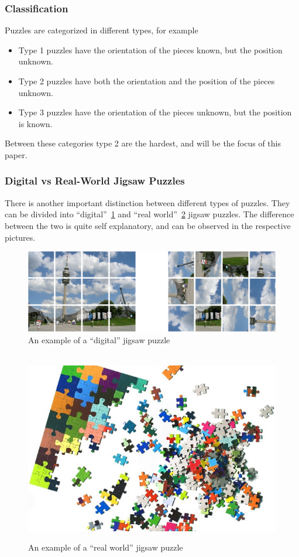 \documentclass{article}
\begin{document}
\subsubsection{Classification}
Puzzles are categorized in different types, for example 
\begin{itemize}
  \item Type 1 puzzles have the orientation of the pieces known, but the position unknown. 
  \item Type 2 puzzles have both the orientation and the position of the pieces unknown.
  \item Type 3 puzzles have the orientation of the pieces unknown, but the position is known.
\end{itemize}
Between these categories type 2 are the hardest, and will be the focus of this paper.

\subsubsection{Digital vs Real-World Jigsaw Puzzles}

There is  another important distinction between different types of puzzles.
They can be divided into “digital”~\cref{fig:figure_digital_puzzle} and
“real world”~\cref{fig:figure_real_puzzle} jigsaw puzzles.
The difference between the two is quite self explanatory,
and can be observed in the respective pictures.
\label{document:DigitalVSReal}

\begin{figure}[H]
    \caption{An example of a “digital” jigsaw  puzzle}\label{fig:figure_digital_puzzle}
    \centering
    \includegraphics[height=0.25\textwidth]{pictures/digital_puzzle.png}
\end{figure}

\begin{figure}[H]
    \caption{An example of a ``real world'' jigsaw  puzzle}~\label{fig:figure_real_puzzle}
    \includegraphics[height=0.25\textwidth]{pictures/real_puzzle.jpg}
    \centering

\end{figure}
\end{document}
